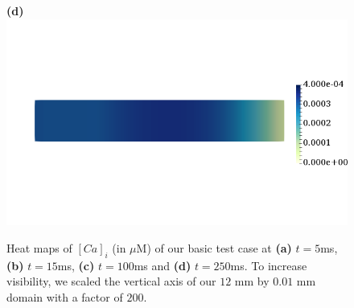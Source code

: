 \documentclass[12pt,a4paper]{article}
\begin{document}
\begin{figure}
\begin{minipage}{0.47\textwidth}
  \textbf{(d)} \includegraphics[trim=0cm 4cm 0cm 4cm, clip=true, width=0.9\linewidth]{c250}
    \end{minipage}
    \caption{Heat maps of $[Ca]_i$ (in $\mu$M) of our basic test case at \textbf{(a)} $t=5$ms, \textbf{(b)} $t=15$ms, \textbf{(c)} $t=100$ms and \textbf{(d)} $t=250$ms. To increase visibility, we scaled the vertical axis of our $12$ mm by $0.01$ mm domain with a factor of $200$.}
    \label{fig:2}
\end{figure}
%
\end{document}
